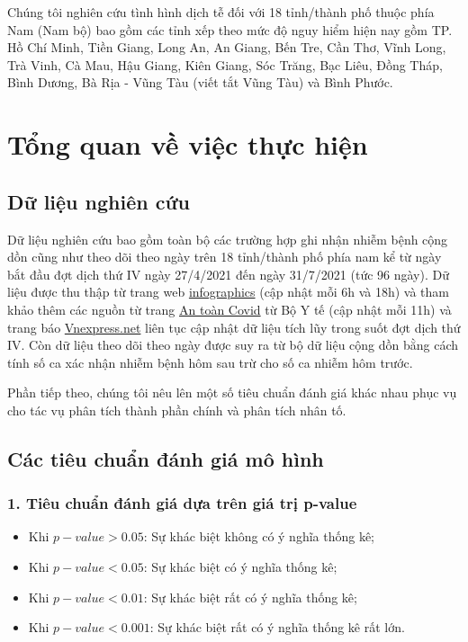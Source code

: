 \documentclass[../thesis.tex]{subfiles}
\begin{document}
Chúng tôi nghiên cứu tình hình dịch tễ đối với 18 tỉnh/thành phố thuộc phía Nam (Nam bộ) bao gồm các tỉnh xếp theo mức độ nguy hiểm hiện nay gồm TP. Hồ Chí Minh, Tiền Giang, Long An, An Giang, Bến Tre, Cần Thơ, Vĩnh Long, Trà Vinh, Cà Mau, Hậu Giang, Kiên Giang, Sóc Trăng, Bạc Liêu, Đồng Tháp, Bình Dương, Bà Rịa - Vũng Tàu (viết tắt Vũng Tàu) và Bình Phước.





\section{Tổng quan về việc thực hiện}





\subsection{Dữ liệu nghiên cứu}

Dữ liệu nghiên cứu bao gồm toàn bộ các trường hợp ghi nhận nhiễm bệnh cộng dồn cũng như theo dõi theo ngày trên 18 tỉnh/thành phố phía nam kể từ ngày bắt đầu đợt dịch thứ IV ngày 27/4/2021 đến ngày 31/7/2021 (tức 96 ngày). Dữ liệu được thu thập từ trang web \href{https://infographics.vn/interactive-du-lieu-dot-dich-covid-19-thu-4-tai-viet-nam-lien-tuc-cap-nhat/20981.vna}{infographics} (cập nhật mỗi 6h và 18h) và tham khảo thêm các nguồn từ trang \href{https://nguyco.antoancovid.vn}{An toàn Covid} từ Bộ Y tế (cập nhật mỗi 11h) và trang báo \href{https://vnexpress.net/covid-19/covid-19-viet-nam}{Vnexpress.net} liên tục cập nhật dữ liệu tích lũy trong suốt đợt dịch thứ IV. Còn dữ liệu theo dõi theo ngày được suy ra từ bộ dữ liệu cộng dồn bằng cách tính số ca xác nhận nhiễm bệnh hôm sau trừ cho số ca nhiễm hôm trước.

Phần tiếp theo, chúng tôi nêu lên một số tiêu chuẩn đánh giá khác nhau phục vụ cho tác vụ phân tích thành phần chính và phân tích nhân tố.

\subsection{Các tiêu chuẩn đánh giá mô hình}
\subsubsection{1. Tiêu chuẩn đánh giá dựa trên giá trị p-value} 
	\begin{itemize}
		\item Khi $ p-value > 0.05 $: Sự khác biệt không có ý nghĩa thống kê; 
		\item Khi $ p-value < 0.05 $: Sự khác biệt có ý nghĩa thống kê; 
		\item Khi $ p-value < 0.01 $: Sự khác biệt rất có ý nghĩa thống kê; 
		\item Khi $ p-value < 0.001 $: Sự khác biệt rất có ý nghĩa thống kê rất lớn.
	\end{itemize}
\end{document}

